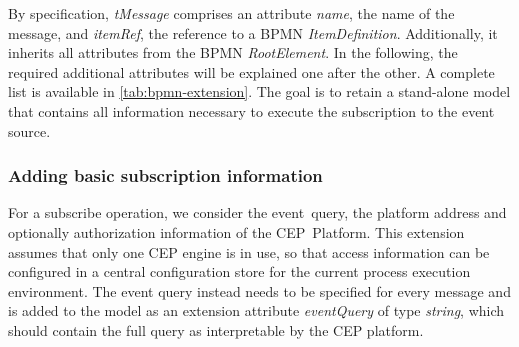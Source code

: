 
By specification, \textit{tMessage} comprises an attribute \textit{name}, the name of the message, and \textit{itemRef}, the reference to a BPMN \textit{ItemDefinition}. Additionally, it inherits all attributes from the BPMN \textit{RootElement}.
In the following, the required additional attributes will be explained one after the other. A complete list is available in \autoref{tab:bpmn-extension}. The goal is to retain a stand-alone model that contains all information necessary to execute the subscription to the event source.


\subsubsection*{Adding basic subscription information}\label{ch:bpmnx:basic}

For a subscribe operation, we consider the event~query, the platform address and optionally authorization information of the CEP~Platform.
This extension assumes that only one CEP engine is in use, so that access information can be configured in a central configuration store for the current process execution environment.
The event query instead needs to be specified for every message and is added to the model as an extension attribute \textit{eventQuery} of type \textit{string}, which should contain the full query as interpretable by the CEP platform.

